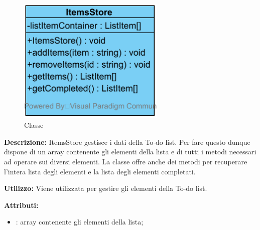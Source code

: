 \paragraph[::ItemsStore]{\class}\mbox{}\\ \label{\class}
\begin{figure}[H]
	\centering
	\includegraphics[width=7cm]{./diagrammi/todo/itemsstore.png}
	\caption{Classe \class}
\end{figure}
\textbf{Descrizione:}
ItemsStore gestisce i dati della To-do list. Per fare questo dunque dispone di un array contenente gli elementi della lista e di tutti i metodi necessari ad operare sui diversi elementi. La classe offre anche dei metodi per recuperare l'intera lista degli elementi e la lista degli elementi completati.

\textbf{Utilizzo:}
Viene utilizzata per gestire gli elementi della To-do list.

\textbf{Attributi:}
\begin{itemize}
	\item {}: array contenente gli elementi della lista;
\end{itemize}

